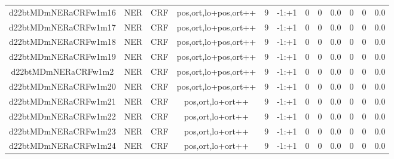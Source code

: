 \documentclass[a4paper]{article}
\begin{document}
\begin{landscape}
\begin{center}
\begin{tabular}{ |c|c|c|c|c|c|c|c|c|c|c|c|}
 
 	
 	\small{ d22btMDmNERaCRFw1m16 } & \small{ NER} & \small{  CRF }  & pos,ort,lo+pos,ort++  &  9 &  \small{  -1:+1 }  &  0 & 0 & 0.0  &  0 & 0 & 0.0 \\
 	

 
 	
 	\small{ d22btMDmNERaCRFw1m17 } & \small{ NER} & \small{  CRF }  & pos,ort,lo+pos,ort++  &  9 &  \small{  -1:+1 }  &  0 & 0 & 0.0  &  0 & 0 & 0.0 \\
 	

 
 	
 	\small{ d22btMDmNERaCRFw1m18 } & \small{ NER} & \small{  CRF }  & pos,ort,lo+pos,ort++  &  9 &  \small{  -1:+1 }  &  0 & 0 & 0.0  &  0 & 0 & 0.0 \\
 	

 
 	
 	\small{ d22btMDmNERaCRFw1m19 } & \small{ NER} & \small{  CRF }  & pos,ort,lo+pos,ort++  &  9 &  \small{  -1:+1 }  &  0 & 0 & 0.0  &  0 & 0 & 0.0 \\
 	

 
 	
 	\small{ d22btMDmNERaCRFw1m2 } & \small{ NER} & \small{  CRF }  & pos,ort,lo+pos,ort++  &  9 &  \small{  -1:+1 }  &  0 & 0 & 0.0  &  0 & 0 & 0.0 \\
 	

 
 	
 	\small{ d22btMDmNERaCRFw1m20 } & \small{ NER} & \small{  CRF }  & pos,ort,lo+pos,ort++  &  9 &  \small{  -1:+1 }  &  0 & 0 & 0.0  &  0 & 0 & 0.0 \\
 	

 
 	
 	\small{ d22btMDmNERaCRFw1m21 } & \small{ NER} & \small{  CRF }  & pos,ort,lo+ort++  &  9 &  \small{  -1:+1 }  &  0 & 0 & 0.0  &  0 & 0 & 0.0 \\
 	

 
 	
 	\small{ d22btMDmNERaCRFw1m22 } & \small{ NER} & \small{  CRF }  & pos,ort,lo+ort++  &  9 &  \small{  -1:+1 }  &  0 & 0 & 0.0  &  0 & 0 & 0.0 \\
 	

 
 	
 	\small{ d22btMDmNERaCRFw1m23 } & \small{ NER} & \small{  CRF }  & pos,ort,lo+ort++  &  9 &  \small{  -1:+1 }  &  0 & 0 & 0.0  &  0 & 0 & 0.0 \\
 	

 
 	
 	\small{ d22btMDmNERaCRFw1m24 } & \small{ NER} & \small{  CRF }  & pos,ort,lo+ort++  &  9 &  \small{  -1:+1 }  &  0 & 0 & 0.0  &  0 & 0 & 0.0 \\
 	


\end{tabular}
\end{center}
\end{landscape}
\end{document}
